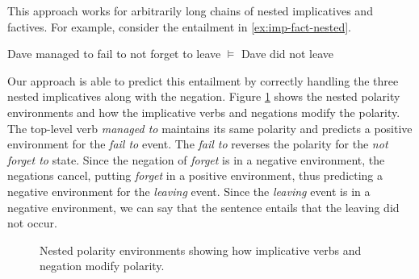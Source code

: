 This approach works for arbitrarily long chains of nested implicatives and
factives.
For example, consider the entailment in \eqref{ex:imp-fact-nested}.
\begin{covex}\label{ex:imp-fact-nested}
  Dave managed to fail to not forget to leave $\vDash$ Dave did not leave
\end{covex}
Our approach is able to predict this entailment by correctly handling the three
nested implicatives along with the negation. Figure \ref{fig:imp-fact-nested} 
shows the nested polarity environments and how the implicative verbs and negations 
modify the polarity.  The top-level verb {\it managed to} maintains its same 
polarity and predicts a positive environment for the {\it fail to} event.  The 
{\it fail to} reverses the polarity for the {\it not forget to} state.  Since
the negation of {\it forget} is in a negative environment, the negations cancel,
putting {\it forget} in a positive environment, thus predicting a
negative environment for the {\it leaving} event.  Since the {\it leaving} event
is in a negative environment, we can say that the sentence entails that the 
leaving did not occur.
\begin{figure}
\caption{Nested polarity environments showing how implicative verbs and
negation modify polarity.}
\label{fig:imp-fact-nested}
\end{figure}



